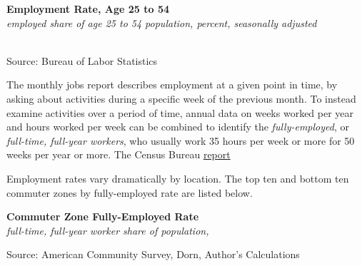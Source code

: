 \documentclass{report}
\makeatletter
\newcommand{\tbllink}[1]{\href{https://raw.githubusercontent.com/bdecon/US-chartbook/master/chartbook/data/#1}{\faTable}}
\newcommand*\short[1]{\expandafter\@gobbletwo\number\numexpr#1\relax}
\newcommand{\dateaxisticks}{
		date coordinates in=x, axis line style={draw=none},
		xmax={2023-11-30},
		max space between ticks=40,	    
		xtick={{1990-01-01}, {1992-01-01}, {1994-01-01}, 
			{1996-01-01}, {1998-01-01}, {2000-01-01}, 
			{2002-01-01}, {2004-01-01}, {2006-01-01},
			{2008-01-01}, {2010-01-01}, {2012-01-01}, {2014-01-01},
		    {2016-01-01}, {2018-01-01}, {2020-01-01}, {2022-01-01}, 
		    {2024-01-01}, {2026-01-01}},
		minor xtick={{1989-01-01}, {1991-01-01}, {1993-01-01},
			{1995-01-01}, {1997-01-01}, {1999-01-01}, 
			{2001-01-01}, {2003-01-01}, {2005-01-01}, {2007-01-01},
		    {2009-01-01}, {2011-01-01}, {2013-01-01}, {2015-01-01},
		    {2017-01-01}, {2019-01-01}, {2021-01-01}, {2023-01-01}, 
		    {2025-01-01}, {2027-01-01}},
		enlarge y limits={0.06}, enlarge x limits={0.01},
		xticklabel style={align=center, yshift=-2pt}, tick label style={inner sep=0pt},
		}
\newcommand{\stdline}[4]{\addplot[very thick, no markers, color=#1] 
		table [x=#2, y=#3, col sep=comma] {#4};	}
\newcommand{\rbars}{
		\fill[color=black!10] (axis cs:{1990-07-01},\pgfkeysvalueof{/pgfplots/ymin}) rectangle 
			(axis cs:{1991-03-01}, \pgfkeysvalueof{/pgfplots/ymax});
		\fill[color=black!10] (axis cs:{2007-12-01},\pgfkeysvalueof{/pgfplots/ymin}) rectangle 
			(axis cs:{2009-07-01}, \pgfkeysvalueof{/pgfplots/ymax});
		\fill[color=black!10] (axis cs:{2001-03-01},\pgfkeysvalueof{/pgfplots/ymin}) rectangle 
			(axis cs:{2001-11-01}, \pgfkeysvalueof{/pgfplots/ymax});
		\fill[color=black!10] (axis cs:{2020-02-01},\pgfkeysvalueof{/pgfplots/ymin}) rectangle 
			(axis cs:{2020-05-01}, \pgfkeysvalueof{/pgfplots/ymax});}
\makeatother
\begin{document}
{\begin{minipage}{0.76\textwidth}
\normalsize \textbf{Employment Rate, Age 25 to 54}\\
\footnotesize{\textit{employed share of age 25 to 54 population, percent, seasonally adjusted}}\\
\hspace*{-1mm} \\
\footnotesize{Source: Bureau of Labor Statistics} \hfill \tbllink{epop.csv}
\end{minipage}
\newpage
\begin{minipage}{0.76\textwidth} 
\small The monthly jobs report describes employment at a given point in time, by asking about activities during a specific week of the previous month. To instead examine activities over a period of time, annual data on weeks worked per year and hours worked per week can be combined to identify the \textit{fully-employed}, or \textit{full-time, full-year workers}, who usually work 35 hours per week or more for 50 weeks per year or more. The Census Bureau \href{https://www.census.gov/data/tables/time-series/demo/income-poverty/cps-pinc/pinc-01.html#par_textimage_14}{report} 

Employment rates vary dramatically by location. The top ten and bottom ten commuter zones by fully-employed rate are listed below.
\end{minipage}
\vspace{1mm}

\begin{minipage}{0.55\textwidth}
\normalsize \textbf{Commuter Zone Fully-Employed Rate}\\
\footnotesize{\textit{full-time, full-year worker share of population, }}\\
\vspace*{-6mm}

\hspace{-11mm} 

\vspace{-4mm}
\footnotesize{Source: American Community Survey, Dorn, Author's Calculations}
\end{minipage} \hspace{3mm}
\begin{minipage}{0.24\textwidth}
\vspace{-1mm}


\end{minipage}}
\end{document}
